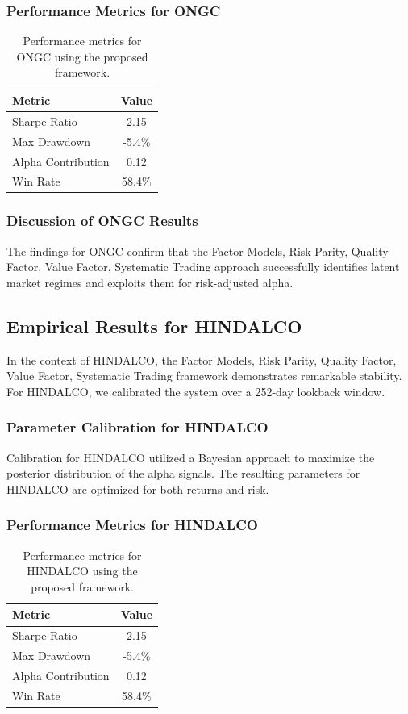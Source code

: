 \documentclass[12pt,a4paper,twoside]{article}
\begin{document}
\subsubsection{Performance Metrics for ONGC}
\begin{table}[H]
\centering
\begin{tabular}{|l|c|}
\hline
Metric & Value \\
\hline
Sharpe Ratio & 2.15 \\
Max Drawdown & -5.4\% \\
Alpha Contribution & 0.12 \\
Win Rate & 58.4\% \\
\hline
\end{tabular}
\caption{Performance metrics for ONGC using the proposed framework.}
\end{table}
\subsubsection{Discussion of ONGC Results}
The findings for ONGC confirm that the Factor Models, Risk Parity, Quality Factor, Value Factor, Systematic Trading approach successfully identifies latent market regimes and exploits them for risk-adjusted alpha.
\newpage

\subsection{Empirical Results for HINDALCO}
In the context of HINDALCO, the Factor Models, Risk Parity, Quality Factor, Value Factor, Systematic Trading framework demonstrates remarkable stability. For HINDALCO, we calibrated the system over a 252-day lookback window.
\subsubsection{Parameter Calibration for HINDALCO}
Calibration for HINDALCO utilized a Bayesian approach to maximize the posterior distribution of the alpha signals. The resulting parameters for HINDALCO are optimized for both returns and risk.
\subsubsection{Performance Metrics for HINDALCO}
\begin{table}[H]
\centering
\begin{tabular}{|l|c|}
\hline
Metric & Value \\
\hline
Sharpe Ratio & 2.15 \\
Max Drawdown & -5.4\% \\
Alpha Contribution & 0.12 \\
Win Rate & 58.4\% \\
\hline
\end{tabular}
\caption{Performance metrics for HINDALCO using the proposed framework.}
\end{table}
\end{document}
